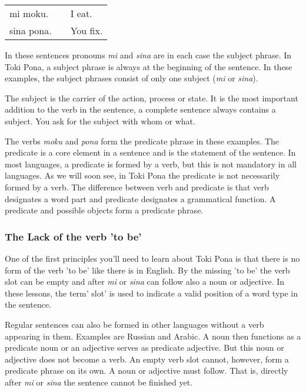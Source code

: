 \begin{supertabular}{p{5,5cm}|ll}
mi moku. && I eat. \\
sina pona. && You fix. \\
\end{supertabular} 

In these sentences pronouns \textit{mi} and \textit{sina} are in each case the subject phrase. 
In Toki Pona, a subject phrase is always at the beginning of the sentence. 
In these examples, the subject phrases consist of only one subject (\textit{mi} or \textit{sina}).

The subject is the carrier of the action, process or state. 
It is the most important addition to the verb in the sentence, a complete sentence always contains a subject. 
You ask for the subject with whom or what.

The verbs \textit{moku} and \textit{pona} form the predicate phrase in these examples.  
The predicate is a core element in a sentence and is the statement of the sentence.
In most languages, a predicate is formed by a verb, but this is not mandatory in all languages. 
As we will soon see, in Toki Pona the predicate is not necessarily formed by a verb. 
The difference between verb and predicate is that verb designates a word part and predicate designates a grammatical function.
A predicate and possible objects form a predicate phrase. 
%
\newpage{}
\subsubsection*{The Lack of the verb 'to be'}
%
One of the first principles you'll need to learn about Toki Pona is that there is no form of the verb 'to be' like there is in English. 
By the missing 'to be' the verb slot can be empty and after \textit{mi} or \textit{sina} can follow also a noun or adjective. 
In these lessons, the term' slot' is used to indicate a valid position of a word type in the sentence.

Regular sentences can also be formed in other languages without a verb appearing in them. 
Examples are Russian and Arabic. 
A noun then functions as a predicate noun or an adjective serves as predicate adjective.
But this noun or adjective does not become a verb. 
An empty verb slot cannot, however, form a predicate phrase on its own. 
A noun or adjective must follow. 
That is, directly after \textit{mi} or \textit{sina} the sentence cannot be finished yet.


